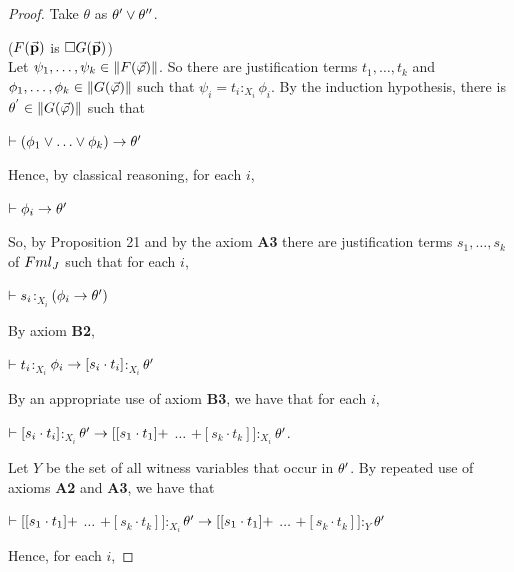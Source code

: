 \begin{proof}
	
	\qquad Take $\theta$ as $\theta^{\prime} \vee \theta^{\prime\prime}$.\\    
	
\pagebreak
	
	($F(\vec{\textbf{p}})$ is $\Box G(\vec{\textbf{p}})$)\\    
	
	\qquad Let $\psi_{1}, \dots, \psi_{k} \in \Arrowvert F(\vec{\varphi}) \Arrowvert$. So there are justification terms $t_{1}, \dots, t_{k}$ and $\phi_{1}, \dots, \phi_{k} \in \Arrowvert G(\vec{\varphi}) \Arrowvert$ such that $\psi_{i} =     t_{i}$$:_{X_{i}}$$\phi_{i}$.
	By the induction hypothesis, there is $\theta^{^{\prime}} \in \Arrowvert G(\vec{\varphi}) \Arrowvert$ such that  
	
	
	\begin{center}
		$\teo (\phi_{1} \ou \dots \ou \phi_{k}) \impli \theta\p$\
	\end{center}
Hence, by classical reasoning, for each $i$,
	
	\begin{center}
		$\vdash \phi_{i} \rightarrow \theta^{\prime}$\
	\end{center}
	
\qquad So, by Proposition 21 and by the axiom \textbf{A3} there are  justification terms $s_{1}, \dots, s_{k}$ of $Fml_{J}$ such that for each $i$,
	
	
	\begin{center}
		$\vdash s_{i}$$:_{X_{i}}$$(\phi_{i} \rightarrow \theta^{\prime})$\
	\end{center}
By axiom \textbf{B2},
	
	
	\begin{center}
		$\vdash t_{i}$$:_{X_{i}}$$\phi_{i}  \rightarrow [s_{i} \cdot t_{i}]$$:_{X_{i}}$$\theta^{\prime}$\
	\end{center}
By an appropriate use of axiom \textbf{B3}, we have that for each $i$, 
	
	
	\begin{center}
		$\vdash [s_{i} \cdot t_{i}]$$:_{X_{i}}$$\theta^{\prime}  \rightarrow [[s_{1} \cdot t_{1}] +$ $\dots$ $+ [s_{k} \cdot t_{k}]]$$:_{X_{i}}$$\theta^{\prime}$.
	\end{center}
	
	
	\qquad Let $Y$ be the set of all witness variables that occur in $\theta^{\prime}$. By repeated use of axioms \textbf{A2} and \textbf{A3}, we have that
	
	
	\begin{center}
		$\vdash [[s_{1} \cdot t_{1}] +$ $\dots$ $+ [s_{k} \cdot t_{k}]]$$:_{X_{i}}$$\theta^{\prime}  \rightarrow [[s_{1} \cdot t_{1}] +$ $\dots$ $+ [s_{k} \cdot t_{k}]]$$:_{Y}$$\theta^{\prime}$
	\end{center}
Hence, for each $i$, 
	

\end{proof}
